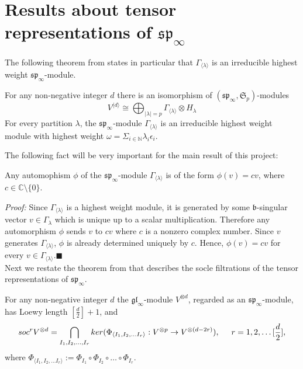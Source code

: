 \section{Results about tensor representations of $\mathfrak{sp}_{\infty}$}
The following theorem from \cite{styrk} states in particular that $\Gamma_{\langle\lambda\rangle}$ is an irreducible highest weight $\mathfrak{sp}_{\infty}$-module.
\begin{thm}

For any non-negative integer $d$ there is an isomorphism of $(\mathfrak{sp}_{\infty},\mathfrak{S}_p)$-modules
$$V^{\langle d\rangle}\cong \bigoplus_{|\lambda|=p}\Gamma_{\langle \lambda\rangle} \otimes H_{\lambda}$$For every partition $\lambda$, the $\mathfrak{sp}_{\infty}$-module  $\Gamma_{\langle \lambda \rangle}$ is an irreducible highest weight module with highest weight $\omega=\Sigma_{i\in\mathbb{N}}\lambda_{i}\epsilon_{i}.$
\end{thm}
The following fact will be very important for the main result of this project:
\begin{lem}
Any automophism $\phi$ of the $\mathfrak{sp}_{\infty}$-module \textit{ $\Gamma_{\langle\lambda\rangle}$} is of the form $\phi(v)=cv$, where $c\in \mathbb{C}\setminus\{0\}.$
\end{lem}
\emph{Proof: } Since $\Gamma_{\langle\lambda\rangle}$ is a highest weight module, it is generated by some $\mathfrak{b}$-singular vector $v\in \Gamma_{\lambda}$ which is unique up to a scalar multiplication. Therefore any automorphism $\phi$ sends $v$ to $cv$ where $c$ is a nonzero complex number. Since $v$ generates $\Gamma_{\langle\lambda\rangle}$, $\phi$ is already determined uniquely by $c$. Hence, $\phi(v)=cv$ for every $v\in\Gamma_{\langle\lambda\rangle} $.$\blacksquare$
\\Next we restate the theorem from \cite{styrk} that describes the socle filtrations of the tensor representations of $\mathfrak{sp}_{\infty}$.
\begin{thm}
For any non-negative integer $d$ the $\mathfrak{gl}_{\infty}$-module $V^{\otimes d} $, regarded as an $\mathfrak{sp}_{\infty}$-module, has Loewy length $[\frac{d}{2}]+1$, and
$$soc^{r}V^{\otimes d}=\bigcap_{I_1,I_2,\dots,I_r}ker(\Phi_{\langle I_1, I_2, \dots I_r\rangle}:V^{\otimes p}\rightarrow V^{\otimes(d-2r)}),\hspace{5mm} r=1,2,\dots [\frac{d}{2} ],$$ where $\Phi_{\langle I_1, I_2, \dots I_r\rangle}:= \Phi_{I_1} \circ \Phi_{I_2} \circ \dots \circ \Phi_{I_r}.$
\end{thm}
